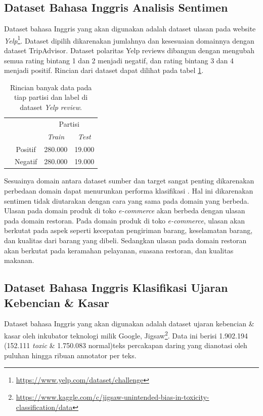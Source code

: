 	\subsection{Dataset Bahasa Inggris Analisis Sentimen}
	Dataset bahasa Inggris yang akan digunakan adalah dataset ulasan pada website \textit{Yelp}\footnote{\url{https://www.yelp.com/dataset/challenge}}. Dataset dipilih dikarenakan jumlahnya dan kesesuaian domainnya dengan dataset TripAdvisor. Dataset polaritas Yelp reviews  dibangun dengan mengubah semua rating bintang 1 dan 2 menjadi negatif, dan rating bintang 3 dan 4 menjadi positif. Rincian dari dataset dapat dilihat pada tabel \ref{tab:detail_yelp_review}.

	\begin{table}[ht]
	    \centering
	    \caption{Rincian banyak data pada tiap partisi dan label di dataset \textit{Yelp review}.}
	    \begin{tabular}{@{}cc|cc@{}}
	    \multicolumn{1}{c}{} &\multicolumn{1}{c}{} &\multicolumn{2}{c}{Partisi} \\ 
	    \multicolumn{1}{c}{} & 
	    \multicolumn{1}{c|}{} & 
	    \multicolumn{1}{c}{\textit{Train}} & 
	    \multicolumn{1}{c}{\textit{Test}} \\ 
	    \cline{2-4}
	    \multirow[c]{2}{*}{\rotatebox[origin=tr]{90}{Label}}
	    & Positif  & 280.000 & 19.000   \\[1.5ex]
	    & Negatif  & 280.000 & 19.000   \\ 
	    \cline{2-4}
	    \end{tabular}
	    \label{tab:detail_yelp_review}
	\end{table}

	Sesuainya domain antara dataset sumber dan target sangat penting dikarenakan perbedaan domain dapat menurunkan performa klasifikasi \parencite{Lai_Oguz_Yang_Stoyanov_2019}. Hal ini dikarenakan sentimen tidak diutarakan dengan cara yang sama pada domain yang berbeda. Ulasan pada domain produk di toko \textit{e-commerce} akan berbeda dengan ulasan pada domain restoran. Pada domain produk di toko \textit{e-commerce}, ulasan akan berkutat pada aspek seperti kecepatan pengiriman barang, keselamatan barang, dan kualitas dari barang yang dibeli. Sedangkan ulasan pada domain restoran akan berkutat pada keramahan pelayanan, suasana restoran, dan kualitas makanan.
	
	\subsection{Dataset Bahasa Inggris Klasifikasi Ujaran Kebencian \& Kasar}
	Dataset bahasa Inggris yang akan digunakan adalah dataset ujaran kebencian \& kasar oleh inkubator teknologi milik Google, Jigsaw\footnote{\url{https://www.kaggle.com/c/jigsaw-unintended-bias-in-toxicity-classification/data}}. Data ini berisi 1.902.194 (152.111 \textit{toxic} \& 1.750.083 normal)teks percakapan daring yang dianotasi oleh puluhan hingga ribuan annotator per teks. 


